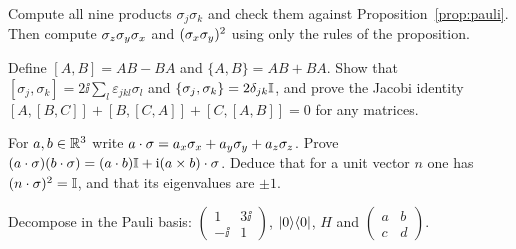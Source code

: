 \begin{exerciseset}
   Compute all nine products $\sigma_j\sigma_k$ and check them against Proposition~\ref{prop:pauli}. Then compute $\sigma_z\sigma_y\sigma_x$ and $(\sigma_x\sigma_y)^2$ using only the rules of the proposition.

   Define $[A,B]=AB-BA$ and $\{A,B\}=AB+BA$. Show that $[\sigma_j,\sigma_k]=2\ii\sum_l\varepsilon_{jkl}\sigma_l$ and $\{\sigma_j,\sigma_k\}=2\delta_{jk}\mathbb{I}$, and prove the Jacobi identity $[A,[B,C]]+[B,[C,A]]+[C,[A,B]]=0$ for any matrices.

   For $a,b\in\mathbb{R}^3$ write $a\cdot\sigma=a_x\sigma_x+a_y\sigma_y+a_z\sigma_z$. Prove $(a\cdot\sigma)(b\cdot\sigma)=(a\cdot b)\mathbb{I}+\mathrm{i}(a\times b)\cdot\sigma$. Deduce that for a unit vector $n$ one has $(n\cdot\sigma)^2=\mathbb{I}$, and that its eigenvalues are $\pm1$.

   Decompose in the Pauli basis: $\begin{pmatrix}1&3\ii\\-\ii&1\end{pmatrix}$, $\left|0\right\rangle\!\left\langle0\right|$, $H$ and $\begin{pmatrix}a&b\\c&d\end{pmatrix}$.
\end{exerciseset}
